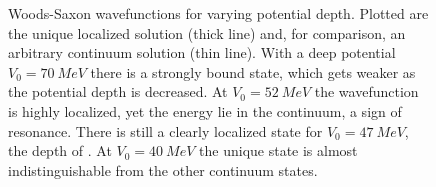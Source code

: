 \documentclass[../main/report.tex]{subfiles}
\begin{document}

\begin{figure}
  \caption{
    Woods-Saxon wavefunctions for varying potential depth. 
    Plotted are the unique localized solution (thick line) and, for comparison, an arbitrary continuum solution (thin line).
    With a deep potential $V_0 = \SI{70}{MeV}$ there is a strongly bound state, which gets weaker as the potential depth is decreased.
    At $V_0 = \SI{52}{MeV}$ the wavefunction is highly localized, yet the energy lie in the continuum, a sign of resonance.
    There is still a clearly localized state for $V_0 = \SI{47}{MeV}$, the depth of . At $V_0 = \SI{40}{MeV}$ the unique state is almost indistinguishable from the other continuum states.
  } 
  \label{fig:wavefunctions}
  \end{figure}

\end{document}
